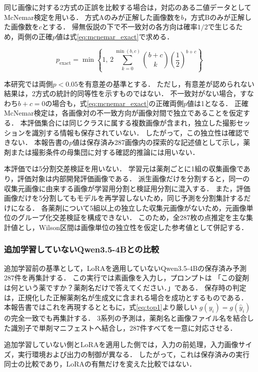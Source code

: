 \documentclass[uplatex,dvipdfmx]{jsarticle}
\begin{document}
同じ画像に対する2方式の正誤を比較する場合は，対応のある二値データとしてMcNemar検定を用いる．
方式Aのみが正解した画像数を$b$，方式Bのみが正解した画像数を$c$とする．
帰無仮説の下で不一致対の各方向は確率$1/2$で生じるため，両側の正確$p$値は式\eqref{eq:mcnemar_exact}で求める．

\begin{equation}
  p_{\mathrm{exact}}
  =
  \min\!\left\{
    1,\,
    2\sum_{k=0}^{\min(b,c)}
    \binom{b+c}{k}
    \left(\frac{1}{2}\right)^{b+c}
  \right\}
  \label{eq:mcnemar_exact}
\end{equation}

本研究では両側$p<0.05$を有意差の基準とする．
ただし，有意差が認められない結果は，2方式の統計的同等性を示すものではない．
不一致対がない場合，すなわち$b+c=0$の場合も，式\eqref{eq:mcnemar_exact}の正確両側$p$値は1となる．
正確McNemar検定は，各画像対の不一致方向が画像対間で独立であることを仮定する．
本評価集合には同じクラスに属する複数画像が含まれ，独立した撮影セッションを識別する情報も保存されていない．
したがって，この独立性は確認できない．
本報告書の$p$値は保存済み287画像内の探索的な記述値として示し，薬剤または撮影条件の母集団に対する確認的推論には用いない．

本評価では5分割交差検証を用いない．
学習元は薬剤ごとに1組の収集画像であり，評価対象は内部開発評価画像である．
派生画像だけを分割すると，同一の収集元画像に由来する画像が学習用分割と検証用分割に混入する．
また，評価画像だけを5分割してもモデルを再学習しないため，同じ予測を分割集計するだけになる．
各薬剤について5組以上の独立した収集元画像がないため，元画像単位のグループ化交差検証を構成できない．
このため，全287枚の点推定を主な集計値とし，Wilson区間は画像単位の独立性を仮定した参考値として併記する．

\subsubsection{追加学習していないQwen3.5-4Bとの比較}

追加学習前の基準として，LoRAを適用していないQwen3.5-4Bの保存済み予測287件を再集計する．
この実行では素画像を入力し，プロンプトは
「この錠剤は何という薬ですか？薬剤名だけで答えてください．」である．
保存時の判定は，正規化した正解薬剤名が生成文に含まれる場合を成功とするものである．
本報告書ではこれを再現するとともに，式\eqref{eq:top1}より厳しい
$g(y_i)=g(\hat{y}_i)$の完全一致でも再集計する．
3系列の予測は，薬剤名と画像ファイル名を結合した識別子で単剤マニフェストへ結合し，287件すべてを一意に対応させる．

追加学習していない側とLoRAを適用した側では，入力の前処理，入力画像サイズ，実行環境および出力の制御が異なる．
したがって，これは保存済みの実行同士の比較であり，LoRAの有無だけを変えた比較ではない．
\end{document}
